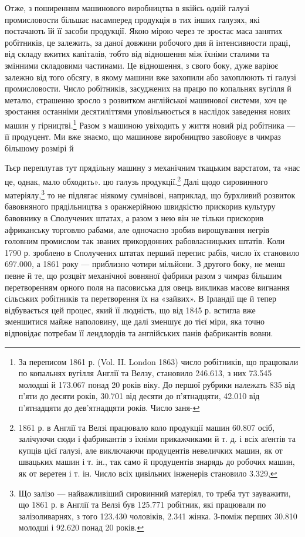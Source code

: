 Отже, з поширенням машинового виробництва в якійсь одній
галузі промисловости більшає насамперед продукція в тих інших
галузях, які постачають їй її засоби продукції. Якою мірою
через те зростає маса занятих робітників, це залежить, за
даної довжини робочого дня й інтенсивности праці, від складу
вжитих капіталів, тобто від відношення між їхніми сталими та
змінними складовими частинами. Це відношення, з свого боку,
дуже варіює залежно від того обсягу, в якому машини вже захопили
або захоплюють ті галузі промисловости. Число робітників,
засуджених на працю по копальнях вугілля й металю, страшенно
зросло з розвитком англійської машинової системи, хоч це зростання
останніми десятиліттями уповільнюється в наслідок заведення
нових машин у гірництві.\footnote{
За переписом 1861 р. (Vol. II. London 1863) число робітників,
що працювали по копальнях вугілля Англії та Велзу, становило 246.613,
з них 73.545 молодші й 173.067 понад 20 років віку. До першої рубрики
належать 835 від п’яти до десяти років, 30.701 від десяти до п’ятнадцяти,
42.010 від п’ятнадцяти до дев’ятнадцяти років. Число заня-
} Разом з машиною увіходить
у життя новий рід робітника — її продуцент. Ми вже знаємо, що
машинове виробництво завойовує в чимраз більшому розмірі й

Тьєр переплутав тут прядільну машину з механічним ткацьким варстатом,
та «нас це, однак, мало обходить».
цю галузь продукції.\footnote{
1861 р. в Англії та Велзі працювало коло продукції машин 60.807
осіб, залічуючи сюди і фабрикантів з їхніми прикажчиками й т. д. і всіх
аґентів та купців цієї галузі, але виключаючи продуцентів невеличких
машин, як от швацьких машин і т. ін., так само й продуцентів знарядь
до робочих машин, як от веретен і т. ін. Число всіх цивільних інженерів
становило 3.329,
} Далі щодо сировинного матеріялу,\footnote{
Що залізо — найважливіший сировинний матеріял, то треба тут
зауважити, що 1861 р. в Англії та Велзі був 125.771 робітник, які
працювали по залізоливарнях, з того 123.430 чоловіків, 2.341 жінка.
З-поміж перших 30.810 молодші і 92.620 понад 20 років.
} то
не підлягає ніякому сумнівові, наприклад, що бурхливий розвиток
бавовняного прядільництва з оранжерійною швидкістю прискорив
культуру бавовнику в Сполучених штатах, а разом з нею
він не тільки прискорив африканську торговлю рабами, але
одночасно зробив вирощування негрів головним промислом так
званих прикордонних рабовласницьких штатів. Коли 1790 р.
зроблено в Сполучених штатах перший перепис рабів, число їх
становило 697.000, а 1861 року — приблизно чотири мільйони.
З другого боку, не менш певне й те, що розцвіт механічної вовняної
фабрики разом з чимраз більшим перетворенням орного поля на
пасовиська для овець викликав масове вигнання сільських робітників
та перетворення їх на «зайвих». В Ірландії ще й тепер
відбувається цей процес, який її людність, що від 1845 р. встигла
вже зменшитися майже наполовину, ще далі зменшує до тієї
міри, яка точно відповідає потребам її лендлордів та англійських
панів фабрикантів вовни.


